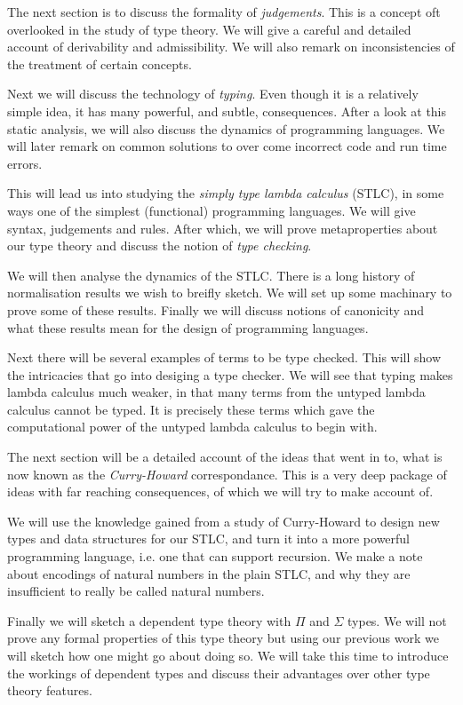 The next section is to discuss the formality of \emph{judgements}. This is a concept oft overlooked in the study of type theory. We will give a careful and detailed account of derivability and admissibility. We will also remark on inconsistencies of the treatment of certain concepts.

Next we will discuss the technology of \emph{typing}. Even though it is a relatively simple idea, it has many powerful, and subtle, consequences. After a look at this static analysis, we will also discuss the dynamics of programming languages. We will later remark on common solutions to over come incorrect code and run time errors.

This will lead us into studying the \emph{simply type lambda calculus} (STLC), in some ways one of the simplest (functional) programming languages. We will give syntax, judgements and rules. After which, we will prove metaproperties about our type theory and discuss the notion of \emph{type checking}.

We will then analyse the dynamics of the STLC. There is a long history of normalisation results we wish to breifly sketch. We will set up some machinary to prove some of these results. Finally we will discuss notions of canonicity and what these results mean for the design of programming languages.

Next there will be several examples of terms to be type checked. This will show the intricacies that go into desiging a type checker. We will see that typing makes lambda calculus much weaker, in that many terms from the untyped lambda calculus cannot be typed. It is precisely these terms which gave the computational power of the untyped lambda calculus to begin with.

The next section will be a detailed account of the ideas that went in to, what is now known as the \emph{Curry-Howard} correspondance. This is a very deep package of ideas with far reaching consequences, of which we will try to make account of.

We will use the knowledge gained from a study of Curry-Howard to design new types and data structures for our STLC, and turn it into a more powerful programming language, i.e. one that can support recursion. We make a note about encodings of natural numbers in the plain STLC, and why they are insufficient to really be called natural numbers.

Finally we will sketch a dependent type theory with $\Pi$ and $\Sigma$ types. We will not prove any formal properties of this type theory but using our previous work we will sketch how one might go about doing so. We will take this time to introduce the workings of dependent types and discuss their advantages over other type theory features.

